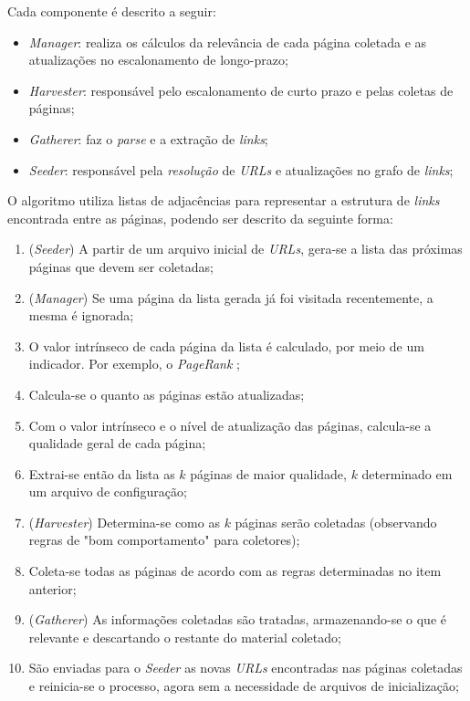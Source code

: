 \documentclass[a4paper,12pt,titlepage]{article}
\begin{document}
Cada componente é descrito a seguir: 

\begin{itemize}
\item \textit{Manager}: realiza os cálculos da relevância de cada página coletada e as atualizações no escalonamento de longo-prazo;
\item \textit{Harvester}: responsável pelo escalonamento de curto prazo e pelas coletas de páginas;
\item \textit{Gatherer}: faz o \textit{parse} e a extração de \textit{links};
\item \textit{Seeder}: responsável pela \textit{resolução} de \textit{URLs} e atualizações no grafo de \textit{links};
\end{itemize} 

O algoritmo utiliza listas de adjacências para representar a estrutura de \textit{links} encontrada entre as páginas, podendo ser descrito da seguinte forma:

\begin{enumerate}
\item (\textit{Seeder}) A partir de um arquivo inicial de \textit{URLs}, gera-se a lista das próximas páginas que devem ser coletadas;
\item (\textit{Manager}) Se uma página da lista gerada já foi visitada recentemente, a mesma é ignorada;
\item O valor intrínseco de cada página da lista é calculado, por meio de um indicador. Por exemplo, o \textit{PageRank} \cite{pagerank};
\item Calcula-se o quanto as páginas estão atualizadas;
\item Com o valor intrínseco e o nível de atualização das páginas, calcula-se a qualidade geral de cada página;
\item Extrai-se então da lista as $k$ páginas de maior qualidade, $k$ determinado em um arquivo de configuração;
\item (\textit{Harvester}) Determina-se como as $k$ páginas serão coletadas (observando regras de "bom comportamento" para coletores);
\item Coleta-se todas as páginas de acordo com as regras determinadas no item anterior;
\item (\textit{Gatherer}) As informações coletadas são tratadas, armazenando-se o que é relevante e descartando o restante do material coletado;
\item São enviadas para o \textit{Seeder} as novas \textit{URLs} encontradas nas páginas coletadas e reinicia-se o processo, agora sem a necessidade de arquivos de inicialização;
\end{enumerate}
\end{document}

